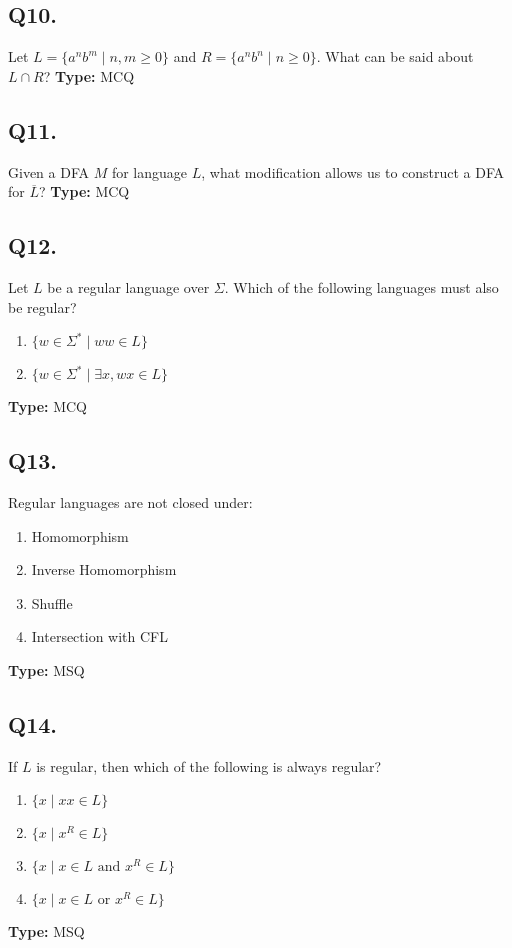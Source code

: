 \subsection*{Q10.}
Let $L = \{ a^n b^m \mid n, m \geq 0 \}$ and $R = \{ a^n b^n \mid n \geq 0 \}$. What can be said about $L \cap R$?
\textbf{Type:} MCQ

\subsection*{Q11.}
Given a DFA $M$ for language $L$, what modification allows us to construct a DFA for $\overline{L}$?
\textbf{Type:} MCQ

\subsection*{Q12.}
Let $L$ be a regular language over $\Sigma$. Which of the following languages must also be regular?
\begin{enumerate}[label=(\alph*)]
    \item $\{ w \in \Sigma^* \mid ww \in L \}$
    \item $\{ w \in \Sigma^* \mid \exists x, wx \in L \}$
\end{enumerate}
\textbf{Type:} MCQ

\subsection*{Q13.}
Regular languages are not closed under:
\begin{enumerate}[label=(\alph*)]
    \item Homomorphism
    \item Inverse Homomorphism
    \item Shuffle
    \item Intersection with CFL
\end{enumerate}
\textbf{Type:} MSQ

\subsection*{Q14.}
If $L$ is regular, then which of the following is always regular?
\begin{enumerate}[label=(\alph*)]
    \item $\{ x \mid xx \in L \}$
    \item $\{ x \mid x^R \in L \}$
    \item $\{ x \mid x \in L \text{ and } x^R \in L \}$
    \item $\{ x \mid x \in L \text{ or } x^R \in L \}$
\end{enumerate}
\textbf{Type:} MSQ


